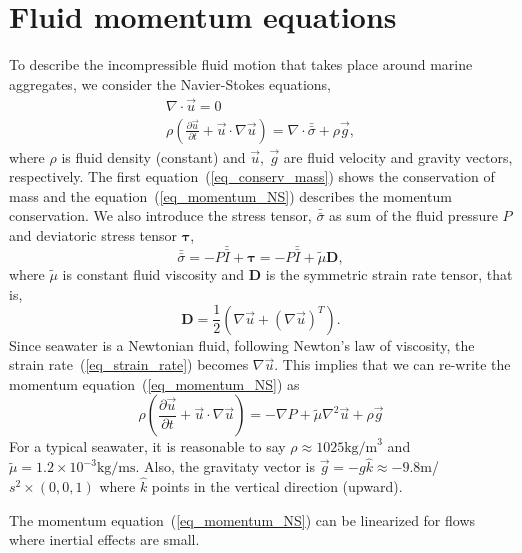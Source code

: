 \section{Fluid momentum equations}
To describe the incompressible fluid motion that takes place around marine aggregates, we consider the Navier-Stokes equations,
\begin{align}
\nabla \cdot \vec{u} = 0 
\label{eq_conserv_mass} \\
\rho 
\left( 
   \frac{\partial \vec{u}}{\partial t} + \vec{u}\cdot \nabla \vec{u}
\right)
  = \nabla \cdot \bar{\bar{\sigma}} +  \rho  \vec{g} ,
\label{eq_momentum_NS}
\end{align}
where $ \rho$ is fluid density (constant) and $\vec{u}, \ \vec{g}$ are fluid velocity and gravity vectors, respectively.
The first equation~(\ref{eq_conserv_mass}) shows the conservation of mass and the equation~(\ref{eq_momentum_NS}) describes the momentum conservation. 
We also introduce the stress tensor, $\bar{\bar{\sigma}}$ as sum of the fluid pressure $P$ and deviatoric stress tensor $\bm{\tau}$,
\begin{equation}
   \bar{\bar{\sigma}} =-P \bar{\bar{I}} + {\bm \tau} = -P \bar{\bar{I}} + {\tilde{\mu}} {\bm D},
   \label{eq_stress_tensor}
\end{equation}
where ${\tilde{\mu}}$ is constant fluid viscosity and ${\bm D}$ is the symmetric strain rate tensor, that is,
\begin{equation}
   \boldsymbol{D} = \frac{1}{2} \left( \nabla \vec{u} + {(\nabla  \vec{u} )}^T \right).
   \label{eq_strain_rate}
   \end{equation}
Since seawater is a Newtonian fluid, following Newton's law of viscosity, the strain rate~(\ref{eq_strain_rate}) becomes $\nabla \vec{u}$. This implies that we can re-write the momentum equation~(\ref{eq_momentum_NS}) as
\begin{equation}
  \rho \left( 
   \frac{\partial \vec{u}}{\partial t} + \vec{u}\cdot \nabla \vec{u}
\right)
  = -\nabla P  + {\tilde{\mu}} \nabla^2 \vec{u}+  \rho  \vec{g} 
  \label{eq_stokes_momentum}
\end{equation}
For a typical seawater, it is reasonable to say $\rho \approx 1025 \text{kg/m}^3$ and ${\tilde{\mu}} = 1.2 \times 10^{-3}\text{kg}/\text{ms}$.
Also, the gravitaty vector is $\vec{g} = - g\hat{k} \approx -9.8$m/$s^2 \times (0,0,1)$ where $\hat{k}$ points in the vertical direction (upward). 
\par
 The momentum equation~(\ref{eq_momentum_NS}) can be linearized for flows where inertial effects are small. 
